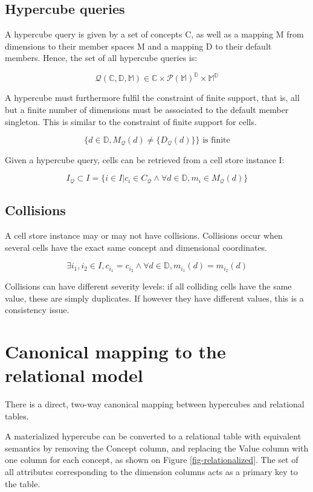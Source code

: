 \documentclass{acm_proc_article-sp}
\begin{document}
\subsection{Hypercube queries}

A hypercube query is given by a set of concepts C, as well as a mapping M from dimensions to their member spaces M and a mapping D to their default members. Hence, the set of all hypercube queries is:

$$\mathcal{Q}(\mathbb{C}, \mathbb{D}, \mathbb{M})\in\mathbb{C}\times\mathcal{P}(\mathbb{M})^\mathbb{D}\times\mathbb{M}^\mathbb{D}$$

A hypercube must furthermore fulfil the constraint of finite support, that is, all but a finite number of dimensions must be associated to the default member singleton. This is similar to the constraint of finite support for cells.

$$\{d\in\mathbb{D}, M_\mathcal{Q}(d)\neq\{D_\mathcal{Q}(d)\}\} \text{ is finite}$$

Given a hypercube query, cells can be retrieved from a cell store instance I:

$$I_\mathcal{Q}\subset I=\{i \in I | c_i\in C_\mathcal{Q} \wedge \forall d\in \mathbb{D}, m_i\in M_\mathcal{Q}(d)\}$$ 

\subsection{Collisions}

A cell store instance may or may not have collisions. Collisions occur when several cells have the exact same concept and dimensional coordinates.

$$\exists i_1, i_2 \in I, c_{i_1}=c_{i_2} \wedge \forall d \in \mathbb{D}, m_{i_1}(d)=m_{i_2}(d)$$

Collisions can have different severity levels: if all colliding cells have the same value, these are simply duplicates. If however they have different values, this is a consistency issue.

\section{Canonical mapping to the relational model}
\label{section-relational-mapping}
There is a direct, two-way canonical mapping between hypercubes and relational tables.

A materialized hypercube can be converted to a relational table with equivalent semantics by removing the Concept column, and replacing the Value column with one column for each concept, as shown on Figure \ref{fig-relationalized}. The set of all attributes corresponding to the dimension columns acts as a primary key to the table.
\end{document}
